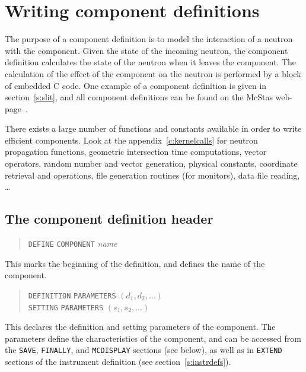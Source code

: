 \section{Writing component definitions}
\label{s:compdefs}

The purpose of a component definition is to model the interaction of a
neutron with the component. Given the state of the incoming neutron, the
component definition calculates the state of the neutron when it leaves
the component.  The calculation of the effect of the component on the
neutron is performed by a block of embedded C code. 
One example of a component definition is given in section~\ref{s:slit}, and all
component definitions can be found on the McStas web-page~\cite{mcstas_webpage}.

There exists a large number of functions and constants available in
order to write efficient components. Look at the appendix~\ref{c:kernelcalls} for neutron propagation functions, geometric intersection time computations, vector operators, random number and vector generation, physical constants, coordinate retrieval and operations, file generation routines (for monitors), data file reading, \ldots



\subsection{The component definition header}
\label{s:comp-header}

\begin{quote}
  \texttt{DEFINE} \texttt{COMPONENT} \textit{name}
\end{quote}
This marks the beginning of the definition, and defines the name of the
component.
\begin{quote}
  \texttt{DEFINITION} \texttt{PARAMETERS} $(d_1, d_2, \ldots)$ \\
  \texttt{SETTING} \texttt{PARAMETERS} $(s_1, s_2, \ldots)$
\end{quote}
This declares the definition and setting parameters of the component.
The parameters define the characteristics of the component, and can be
accessed from the \verb+SAVE+, \verb+FINALLY+, and \verb+MCDISPLAY+ sections (see below), 
as well as in \verb+EXTEND+ sections of the instrument definition (see section~\ref{s:instrdefs}).

